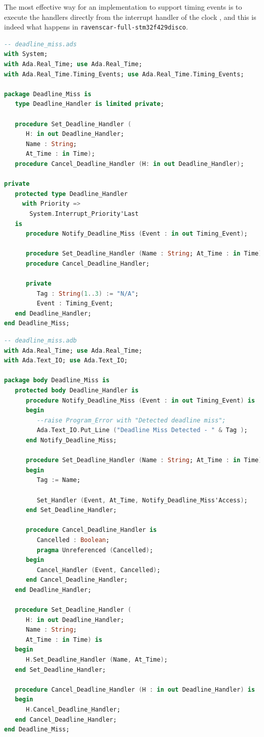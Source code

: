 \documentclass{article}
\begin{document}
The most effective way for an implementation to support timing events is to execute the handlers directly from the interrupt handler of the clock \cite{timing-events}, and this is indeed what happens in \texttt{ravenscar-full-stm32f429disco}.

\begin{lstlisting}[language=Ada]
-- deadline_miss.ads
with System;
with Ada.Real_Time; use Ada.Real_Time;
with Ada.Real_Time.Timing_Events; use Ada.Real_Time.Timing_Events;

package Deadline_Miss is
   type Deadline_Handler is limited private;

   procedure Set_Deadline_Handler (
      H: in out Deadline_Handler;
      Name : String;
      At_Time : in Time);
   procedure Cancel_Deadline_Handler (H: in out Deadline_Handler);

private
   protected type Deadline_Handler
     with Priority =>
       System.Interrupt_Priority'Last
   is
      procedure Notify_Deadline_Miss (Event : in out Timing_Event);

      procedure Set_Deadline_Handler (Name : String; At_Time : in Time);
      procedure Cancel_Deadline_Handler;

      private
         Tag : String(1..3) := "N/A";
         Event : Timing_Event;
   end Deadline_Handler;
end Deadline_Miss;
\end{lstlisting}

\begin{lstlisting}[language=Ada]
-- deadline_miss.adb
with Ada.Real_Time; use Ada.Real_Time;
with Ada.Text_IO; use Ada.Text_IO;

package body Deadline_Miss is
   protected body Deadline_Handler is
      procedure Notify_Deadline_Miss (Event : in out Timing_Event) is
      begin
         --raise Program_Error with "Detected deadline miss";
         Ada.Text_IO.Put_Line ("Deadline Miss Detected - " & Tag );
      end Notify_Deadline_Miss;

      procedure Set_Deadline_Handler (Name : String; At_Time : in Time) is
      begin
         Tag := Name;

         Set_Handler (Event, At_Time, Notify_Deadline_Miss'Access);
      end Set_Deadline_Handler;

      procedure Cancel_Deadline_Handler is
         Cancelled : Boolean;
         pragma Unreferenced (Cancelled);
      begin
         Cancel_Handler (Event, Cancelled);
      end Cancel_Deadline_Handler;
   end Deadline_Handler;

   procedure Set_Deadline_Handler (
      H: in out Deadline_Handler;
      Name : String;
      At_Time : in Time) is
   begin
      H.Set_Deadline_Handler (Name, At_Time);
   end Set_Deadline_Handler;

   procedure Cancel_Deadline_Handler (H : in out Deadline_Handler) is
   begin
      H.Cancel_Deadline_Handler;
   end Cancel_Deadline_Handler;
end Deadline_Miss;
\end{lstlisting}
\end{document}
